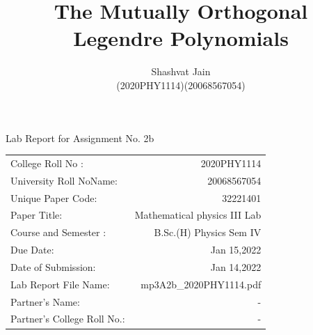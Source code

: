 \documentclass[12pt]{article}
\title{\sffamily The Mutually Orthogonal Legendre Polynomials }
\author{\sffamily Shashvat Jain\\ \sffamily (2020PHY1114)(20068567054)}
\begin{document}

\begin{titlepage}
	\renewcommand\familydefault{\sfdefault}
	\selectfont
	\maketitle
	\vspace{4cm}
	\begin{center}
		\large Lab Report for Assignment No. 2b
	\end{center}
	\vspace{4cm}

	\begin{table}[h]
		\centering	
		\begin{tabularx}{0.55\textwidth}{lr}		
			College Roll No :& 2020PHY1114\\
			University Roll NoName:& 20068567054\\
			Unique Paper Code: &32221401\\
			Paper Title: &Mathematical physics III Lab\\
			Course and Semester :&B.Sc.(H) Physics Sem IV\\
			Due Date: & Jan 15,2022\\
			Date of Submission:& Jan 14,2022\\
			Lab Report File Name:& mp3A2b\_2020PHY1114.pdf\\
			Partner’s Name:& -\\
			Partner’s College  Roll No.:& \sffamily -\\
		\end{tabularx}
	\end{table}
	
\end{titlepage}
\newpage
{}
\end{document}

